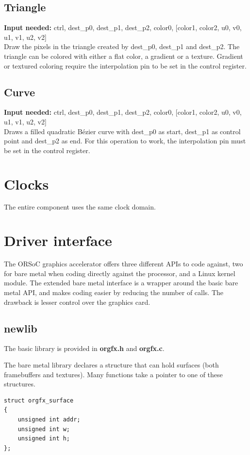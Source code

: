 \documentclass[10pt,a4paper]{article}
\begin{document}
\subsection{Triangle}
\textbf{Input needed:} ctrl, dest\_p0, dest\_p1, dest\_p2, color0, [color1, color2, u0, v0, u1, v1, u2, v2]\\
Draw the pixels in the triangle created by dest\_p0, dest\_p1 and dest\_p2. The triangle can be colored with either a flat color, a gradient or a texture. Gradient or textured coloring require the interpolation pin to be set in the control register.

\subsection{Curve}
\textbf{Input needed:} ctrl, dest\_p0, dest\_p1, dest\_p2, color0, [color1, color2, u0, v0, u1, v1, u2, v2]\\
Draws a filled quadratic B\'{e}zier curve with dest\_p0 as start, dest\_p1 as control point and dest\_p2 as end. For this operation to work, the interpolation pin must be set in the control register.

\section{Clocks}
The entire component uses the same clock domain.

\section{Driver interface}
The ORSoC graphics accelerator offers three different APIs to code against, two for bare metal when coding directly against the processor, and a Linux kernel module. The extended bare metal interface is a wrapper around the basic bare metal API, and makes coding easier by reducing the number of calls. The drawback is lesser control over the graphics card.

\subsection{newlib}
The basic library is provided in \textbf{orgfx.h} and \textbf{orgfx.c}.

The bare metal library declares a structure that can hold surfaces (both framebuffers and textures). Many functions take a pointer to one of these structures.
\begin{lstlisting}
struct orgfx_surface
{
	unsigned int addr;
	unsigned int w;
	unsigned int h;
};
\end{lstlisting}
\end{document}

